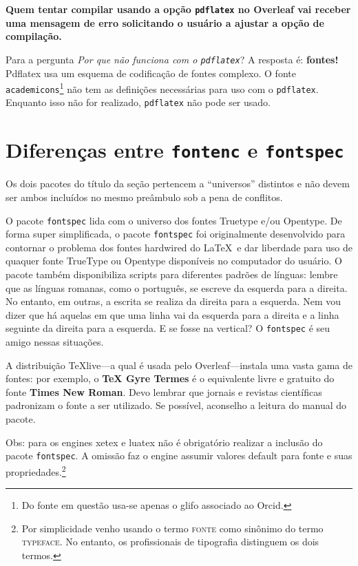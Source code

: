 \documentclass[portuguese]{sbc2025}%
\begin{document}
{\bfseries Quem tentar compilar usando a opção \texttt{pdflatex} no Overleaf vai receber uma mensagem de erro solicitando o usuário a ajustar a opção de compilação.}

Para a pergunta \textit{Por que não funciona com o \texttt{pdflatex}}?  
A resposta é: \textbf{fontes!} Pdflatex usa um esquema de codificação de fontes complexo. O fonte \texttt{academicons}\footnote{Do fonte em questão usa-se apenas o glifo associado ao Orcid.} não tem as definições necessárias para uso com o \texttt{pdflatex}. Enquanto isso não for realizado, \texttt{pdflatex} não pode ser usado. 

\section{Diferenças entre \texttt{fontenc} e \texttt{fontspec}}

Os dois pacotes do título da seção pertencem a ``universos'' distintos e não devem ser ambos incluídos no mesmo preâmbulo sob a pena de conflitos.

O pacote \texttt{fontspec} lida com o universo dos fontes Truetype e/ou Opentype. De forma super simplificada, o pacote \texttt{fontspec} foi originalmente desenvolvido para contornar o problema dos fontes hardwired do \LaTeX\ e dar liberdade para uso de quaquer fonte TrueType ou Opentype  disponíveis no computador do usuário. 
O pacote também disponibiliza scripts para diferentes padrões de línguas: lembre que as línguas romanas, como o português, se escreve da esquerda para a direita. No entanto, em outras, a escrita se realiza da direita para a esquerda. Nem vou dizer que há aquelas em que uma linha vai da esquerda para a direita e a linha seguinte da direita para a esquerda. E se fosse na vertical? O \texttt{fontspec} é seu amigo nessas situações.

A distribuição TeXlive---a qual é usada pelo Overleaf---instala uma vasta gama de fontes: por exemplo, o \textbf{TeX Gyre Termes} é o equivalente livre e gratuito do fonte \textbf{Times New Roman}. Devo lembrar que jornais e revistas científicas padronizam o fonte a ser utilizado. Se possível, aconselho a leitura do manual do pacote.  

Obs: para os engines xetex e luatex não é obrigatório realizar a inclusão do pacote \texttt{fontspec}. A omissão faz o engine assumir valores default para fonte e suas propriedades.\footnote{Por simplicidade venho usando o termo \textsc{fonte} como sinônimo do termo \textsc{typeface}. No entanto, os profissionais de tipografia distinguem os dois termos.}
\end{document}
